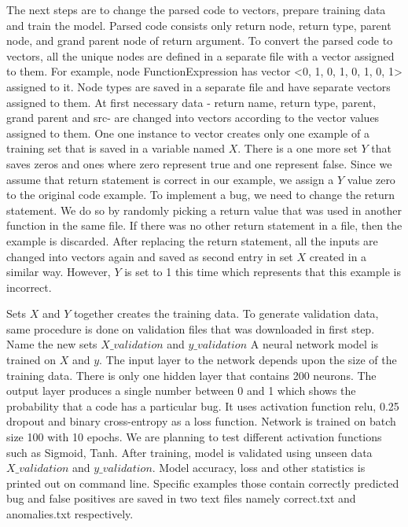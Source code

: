 \documentclass[sigconf]{acmart}
\begin{document}
\newline The next steps are to change the parsed code to vectors, prepare training data and train the model. Parsed code consists only return node, return type, parent node, and grand parent node of return argument. To convert the parsed code to vectors, all the unique nodes are defined in a separate file with a vector assigned to them. For example, node FunctionExpression has vector <0, 1, 0, 1, 0, 1, 0, 1> assigned to it. Node types are saved in a separate file and have separate vectors assigned to them. At first necessary data - return name, return type, parent, grand parent and src- are changed into vectors according to the vector values assigned to them. One one instance to vector creates only one example of a training set that is saved in a variable named $X$. There is a one more set $Y$ that saves zeros and ones where zero represent true and one represent false. Since we assume that return statement is correct in our example, we assign a $Y$ value zero to the original code example. To implement a bug, we need to change the return statement. We do so by randomly picking a return value that was used in another function in the same file. If there was no other return statement in a file, then the example is discarded. After replacing the return statement, all the inputs are changed into vectors again and saved as second entry in set $X$ created in a similar way. However, $Y$ is set to 1 this time which represents that this example is incorrect.

Sets $X$ and $Y$ together creates the training data. To generate validation data, same procedure is done on validation files that was downloaded in first step. Name the new sets $X\_validation$ and $y\_validation$ A neural network model is trained on $X$ and $y$. The input layer to the network depends upon the size of the training data. There is only one hidden layer that contains 200 neurons. The output layer produces a single number between 0 and 1 which shows the probability that a code has a particular bug. It uses activation function relu, 0.25 dropout and binary cross-entropy as a loss function. Network is trained on batch size 100 with 10 epochs. We are planning to test different activation functions such as Sigmoid, Tanh. After training, model is validated using unseen data $X\_validation$ and $y\_validation$. Model accuracy, loss and other statistics is printed out on command line. Specific examples those contain correctly predicted bug and false positives are saved in two text files namely correct.txt and anomalies.txt respectively. 
\end{document}
